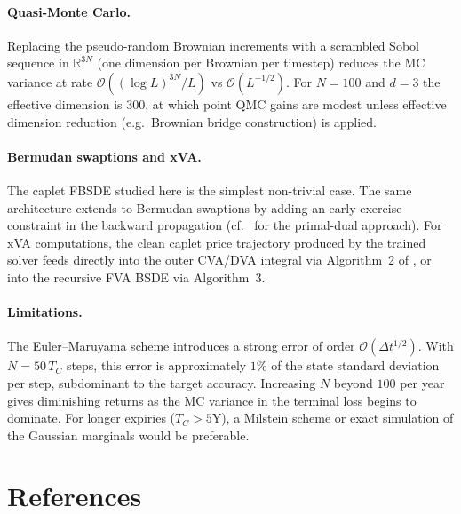 \documentclass[11pt,a4paper]{article}
\newcommand{\R}{\mathbb{R}}
\begin{document}
\paragraph{Quasi-Monte Carlo.}
Replacing the pseudo-random Brownian increments with a scrambled Sobol
sequence in $\R^{3N}$ (one dimension per Brownian per timestep) reduces the
MC variance at rate $\mathcal{O}((\log L)^{3N}/L)$ vs $\mathcal{O}(L^{-1/2})$.
For $N = 100$ and $d = 3$ the effective dimension is $300$, at which point QMC
gains are modest unless effective dimension reduction (e.g.\ Brownian bridge
construction) is applied.

\paragraph{Bermudan swaptions and xVA.}
The caplet FBSDE studied here is the simplest non-trivial case. The same
architecture extends to Bermudan swaptions by adding an early-exercise
constraint in the backward propagation (cf.\ \cite{GPR2022} for the
primal-dual approach). For xVA computations, the clean caplet price
trajectory produced by the trained solver feeds directly into the outer
CVA/DVA integral via Algorithm~2 of \cite{GPR2022}, or into the recursive
FVA BSDE via Algorithm~3.

\paragraph{Limitations.}
The Euler--Maruyama scheme introduces a strong error of order
$\mathcal{O}(\Delta t^{1/2})$. With $N = 50\, T_C$ steps, this error is
approximately $1\%$ of the state standard deviation per step, subdominant to
the target accuracy. Increasing $N$ beyond $100$ per year gives diminishing
returns as the MC variance in the terminal loss begins to dominate. For longer
expiries ($T_C > 5$Y), a Milstein scheme or exact simulation of the Gaussian
marginals would be preferable.

\section*{References}
\end{document}
